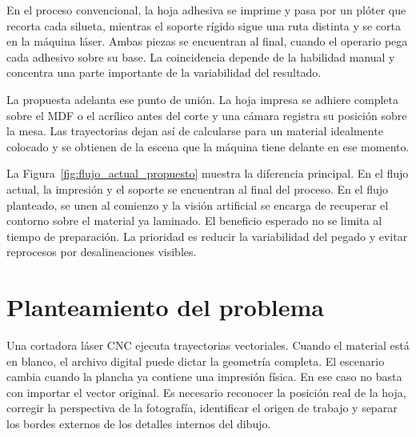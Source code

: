 En el proceso convencional, la hoja adhesiva se imprime y pasa por un plóter que recorta cada silueta, mientras el soporte rígido sigue una ruta distinta y se corta en la máquina láser. Ambas piezas se encuentran al final, cuando el operario pega cada adhesivo sobre su base. La coincidencia depende de la habilidad manual y concentra una parte importante de la variabilidad del resultado.

La propuesta adelanta ese punto de unión. La hoja impresa se adhiere completa sobre el MDF o el acrílico antes del corte y una cámara registra su posición sobre la mesa. Las trayectorias dejan así de calcularse para un material idealmente colocado y se obtienen de la escena que la máquina tiene delante en ese momento.


La Figura~\ref{fig:flujo_actual_propuesto} muestra la diferencia principal. En el flujo actual, la impresión y el soporte se encuentran al final del proceso. En el flujo planteado, se unen al comienzo y la visión artificial se encarga de recuperar el contorno sobre el material ya laminado. El beneficio esperado no se limita al tiempo de preparación. La prioridad es reducir la variabilidad del pegado y evitar reprocesos por desalineaciones visibles.

\section{Planteamiento del problema}

Una cortadora láser CNC ejecuta trayectorias vectoriales. Cuando el material está en blanco, el archivo digital puede dictar la geometría completa. El escenario cambia cuando la plancha ya contiene una impresión física. En ese caso no basta con importar el vector original. Es necesario reconocer la posición real de la hoja, corregir la perspectiva de la fotografía, identificar el origen de trabajo y separar los bordes externos de los detalles internos del dibujo.

